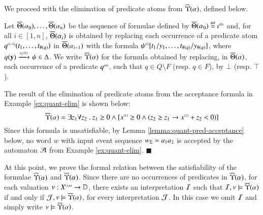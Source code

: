 We proceed with the elimination of predicate atoms from
$\widehat{\Upsilon}({\alpha})$, defined below. 

\begin{definition}\label{def:substform}
  Let $\overline{\Theta}({\alpha_0}), \ldots, \overline{\Theta}({\alpha_n})$ be the
  sequence of formulae defined by $\overline{\Theta}({\alpha_0}) \stackrel{\scriptscriptstyle{\mathsf{def}}}{=}
  {\iota}^{\scriptscriptstyle{({0})}}$ and, for all $i \in [1,n]$,
  $\overline{\Theta}({\alpha_i})$ is obtained by replacing each occurrence of
  a predicate atom ${q}^{\scriptscriptstyle{({i-1})}}(t_1,\ldots,t_{\#(q)})$ in
  $\overline{\Theta}({\alpha_{i-1}})$ with the formula
  ${\psi}^{\scriptscriptstyle{({i})}}[t_1/y_1,\ldots,t_{\#(q)}/y_{\#(q)}]$, where
  $q(\mathbf y) \xrightarrow{{\scriptscriptstyle a_{i}(X)}}_{{\scriptstyle }} \psi \in \Delta$. We write
  $\overline{\Upsilon}({\alpha})$ for the formula obtained by replacing, in
  $\overline{\Theta}({\alpha})$, each occurrence of a predicate
  ${q}^{\scriptscriptstyle{({n})}}$, such that $q \in Q \setminus F$ (resp. $q \in F$),
  by $\bot$ (resp. $\top$).
\end{definition}

\begin{example}\label{ex:pred-elim}
  The result of the elimination of predicate atoms from the acceptance
  formula in Example \ref{ex:quant-elim} is shown below:
  \[\overline{\Upsilon}({\alpha}) = 
  \exists z_1 \forall z_2 ~.~ z_1 \geq 0 \wedge 
          [{x}^{\scriptscriptstyle{({1})}} \geq 0 \wedge (z_2 \geq z_1 \rightarrow
            {x}^{\scriptscriptstyle{({1})}}+z_2 < 0)]\] Since this formula is
          unsatisfiable, by Lemma \ref{lemma:quant-pred-acceptance}
          below, no word $w$ with input event sequence ${w}_\Sigma =
          a_1a_2$ is accepted by the automaton $\mathcal{A}$ from Example
          \ref{ex:quant-elim}. \hfill$\blacksquare$
\end{example}

At this point, we prove the formal relation between the satisfiability
of the formulae $\widehat{\Upsilon}({\alpha})$ and $\overline{\Upsilon}({\alpha})$. Since
there are no occurrences of predicates in $\overline{\Upsilon}({\alpha})$, for
each valuation $\nu : {X}^{\scriptscriptstyle{({\leq n})}} \rightarrow \mathbb{D}$, there
exists an interpretation $\mathcal{I}$ such that $\mathcal{I},\nu \models
\overline{\Upsilon}({\alpha})$ if and only if $\mathcal{J},\nu \models
\overline{\Upsilon}({\alpha})$, for every interpretation $\mathcal{J}$. In this case we
omit $\mathcal{I}$ and simply write $\nu \models \overline{\Upsilon}({\alpha})$.

